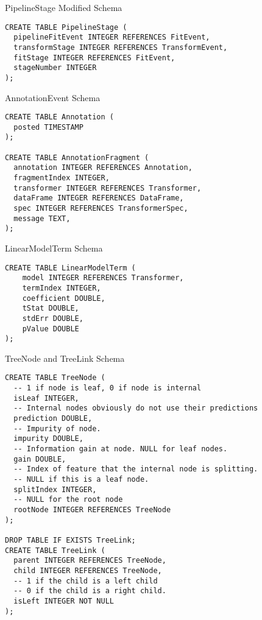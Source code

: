 \begin{listing}
\caption{PipelineStage Modified Schema}
\begin{verbatim}
CREATE TABLE PipelineStage (
  pipelineFitEvent INTEGER REFERENCES FitEvent,
  transformStage INTEGER REFERENCES TransformEvent,
  fitStage INTEGER REFERENCES FitEvent,
  stageNumber INTEGER 
);
\end{verbatim}
\label{listing:pipelinestagemodified}
\end{listing}

\begin{listing}
\caption{AnnotationEvent Schema}
\begin{verbatim}
CREATE TABLE Annotation (
  posted TIMESTAMP
);

CREATE TABLE AnnotationFragment (
  annotation INTEGER REFERENCES Annotation,
  fragmentIndex INTEGER,
  transformer INTEGER REFERENCES Transformer,
  dataFrame INTEGER REFERENCES DataFrame,
  spec INTEGER REFERENCES TransformerSpec,
  message TEXT,
);
\end{verbatim}
\label{listing:annotationevent}
\end{listing}


\begin{listing}
\caption{LinearModelTerm Schema}
\begin{verbatim}
CREATE TABLE LinearModelTerm (
    model INTEGER REFERENCES Transformer,
    termIndex INTEGER,
    coefficient DOUBLE,
    tStat DOUBLE,
    stdErr DOUBLE,
    pValue DOUBLE
);
\end{verbatim}
\label{listing:linearmodel}
\end{listing}

\begin{listing}
\caption{TreeNode and TreeLink Schema}
\begin{verbatim}
CREATE TABLE TreeNode (
  -- 1 if node is leaf, 0 if node is internal
  isLeaf INTEGER, 
  -- Internal nodes obviously do not use their predictions
  prediction DOUBLE, 
  -- Impurity of node.
  impurity DOUBLE, 
  -- Information gain at node. NULL for leaf nodes.
  gain DOUBLE, 
  -- Index of feature that the internal node is splitting. 
  -- NULL if this is a leaf node.
  splitIndex INTEGER, 
  -- NULL for the root node
  rootNode INTEGER REFERENCES TreeNode 
);

DROP TABLE IF EXISTS TreeLink;
CREATE TABLE TreeLink (
  parent INTEGER REFERENCES TreeNode,
  child INTEGER REFERENCES TreeNode,
  -- 1 if the child is a left child 
  -- 0 if the child is a right child.
  isLeft INTEGER NOT NULL 
);
\end{verbatim}
\label{listing:treenode}
\end{listing}

